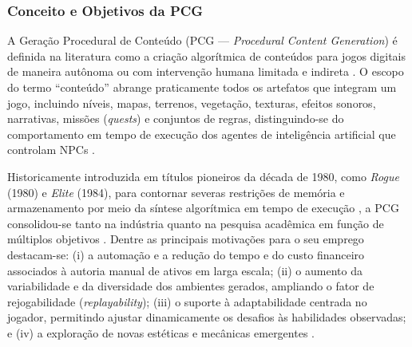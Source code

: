 \subsubsection{Conceito e Objetivos da PCG}
\label{sec:conceito_pcg}

A Geração Procedural de Conteúdo (PCG --- \textit{Procedural Content Generation}) é definida na literatura como a criação algorítmica de conteúdos para jogos digitais de maneira autônoma ou com intervenção humana limitada e indireta \cite{pcgbook, summerville2018procedural, maleki2024procedural}. O escopo do termo ``conteúdo'' abrange praticamente todos os artefatos que integram um jogo, incluindo níveis, mapas, terrenos, vegetação, texturas, efeitos sonoros, narrativas, missões (\textit{quests}) e conjuntos de regras, distinguindo-se do comportamento em tempo de execução dos agentes de inteligência artificial que controlam NPCs \cite{pcgbook, summerville2018procedural, maleki2024procedural}.

Historicamente introduzida em títulos pioneiros da década de 1980, como \textit{Rogue} (1980) e \textit{Elite} (1984), para contornar severas restrições de memória e armazenamento por meio da síntese algorítmica em tempo de execução \cite{pcgbook, summerville2018procedural, araujo2018geracao}, a PCG consolidou-se tanto na indústria quanto na pesquisa acadêmica em função de múltiplos objetivos \cite{linden2014dungeons, pcgbook}. Dentre as principais motivações para o seu emprego destacam-se: (i) a automação e a redução do tempo e do custo financeiro associados à autoria manual de ativos em larga escala; (ii) o aumento da variabilidade e da diversidade dos ambientes gerados, ampliando o fator de rejogabilidade (\textit{replayability}); (iii) o suporte à adaptabilidade centrada no jogador, permitindo ajustar dinamicamente os desafios às habilidades observadas; e (iv) a exploração de novas estéticas e mecânicas emergentes \cite{linden2014dungeons, pcgbook, summerville2018procedural}.

